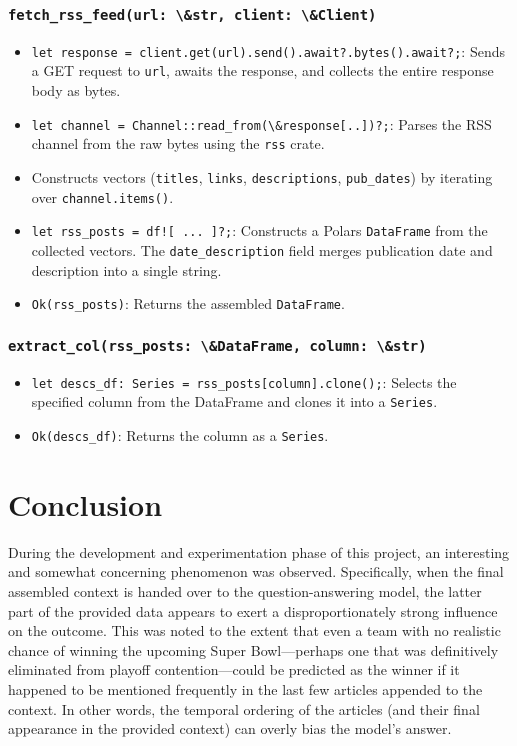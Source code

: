 \subsubsection*{\lstinline{fetch_rss_feed(url: \&str, client: \&Client)}}
\begin{itemize}
    \item \lstinline{let response = client.get(url).send().await?.bytes().await?;}: Sends a GET request to \lstinline{url}, awaits the response, and collects the entire response body as bytes.
    \item \lstinline{let channel = Channel::read_from(\&response[..])?;}: Parses the RSS channel from the raw bytes using the \lstinline{rss} crate.
    \item Constructs vectors (\lstinline{titles}, \lstinline{links}, \lstinline{descriptions}, \lstinline{pub_dates}) by iterating over \lstinline{channel.items()}.
    \item \lstinline{let rss_posts = df![ ... ]?;}: Constructs a Polars \lstinline{DataFrame} from the collected vectors. The \lstinline{date_description} field merges publication date and description into a single string.
    \item \lstinline{Ok(rss_posts)}: Returns the assembled \lstinline{DataFrame}.
\end{itemize}

\subsubsection*{\lstinline{extract_col(rss_posts: \&DataFrame, column: \&str)}}
\begin{itemize}
    \item \lstinline{let descs_df: Series = rss_posts[column].clone();}: Selects the specified column from the DataFrame and clones it into a \lstinline{Series}.
    \item \lstinline{Ok(descs_df)}: Returns the column as a \lstinline{Series}.
\end{itemize}

\section{Conclusion}
During the development and experimentation phase of this project, an interesting and somewhat concerning phenomenon was observed. Specifically, when the final assembled context is handed over to the question-answering model, the latter part of the provided data appears to exert a disproportionately strong influence on the outcome. This was noted to the extent that even a team with no realistic chance of winning the upcoming Super Bowl—perhaps one that was definitively eliminated from playoff contention—could be predicted as the winner if it happened to be mentioned frequently in the last few articles appended to the context. In other words, the temporal ordering of the articles (and their final appearance in the provided context) can overly bias the model’s answer.

